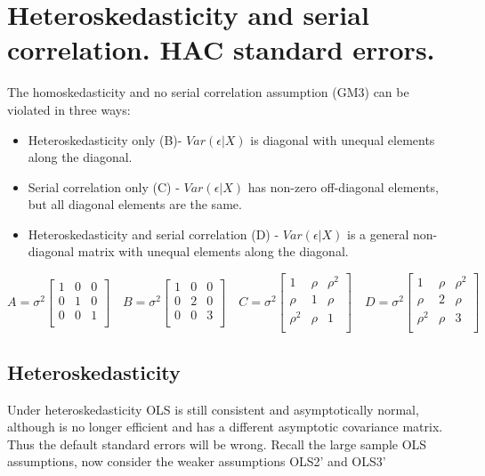 \documentclass[DIV=14,titlepage=false]{scrreprt}
\begin{document}
\vspace{-10pt}
\setcounter{chapter}{5}

\chapter{Heteroskedasticity and serial correlation. HAC standard errors.}
\vspace{-10pt}
The homoskedasticity and no serial correlation assumption (GM3) can be violated in three ways:
\begin{itemize}
    \item Heteroskedasticity only  (B)- $Var(\epsilon|X)$ is diagonal with unequal elements along the diagonal.
    \item Serial correlation only (C) - $Var(\epsilon|X)$ has non-zero off-diagonal elements, but all diagonal elements are the same.
    \item Heteroskedasticity and serial correlation (D) - $Var(\epsilon|X)$ is a general non-diagonal matrix with unequal elements along the diagonal.
\end{itemize}
\[ A = \sigma^2 \begin{bmatrix}
    1&0&0\\
    0&1&0\\
    0&0&1\\
\end{bmatrix} \quad 
B = \sigma^2 \begin{bmatrix}
    1&0&0\\
    0&2&0\\
    0&0&3\\
\end{bmatrix} \quad 
C = \sigma^2 \begin{bmatrix}
    1&\rho&\rho^2\\
    \rho&1&\rho\\
    \rho^2&\rho&1\\
\end{bmatrix} \quad
D = \sigma^2 \begin{bmatrix}
    1&\rho&\rho^2\\
    \rho&2&\rho\\
    \rho^2&\rho&3\\
\end{bmatrix}
\]
\section{Heteroskedasticity}
Under heteroskedasticity OLS is still consistent and asymptotically normal, although is no longer efficient and has a different asymptotic covariance matrix. Thus the default standard errors will be wrong. Recall the large sample OLS assumptions, now consider the weaker assumptions OLS2' and OLS3'
\end{document}
